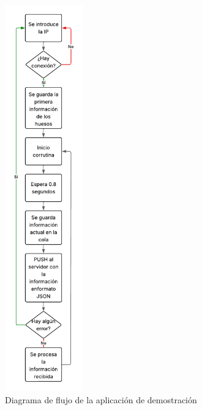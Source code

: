 \begin{figure}[H]
	\centering
	\includegraphics[width=0.3\textwidth]{Imagenes/Vectorial/FlujoAppFinal.pdf}
	\caption{Diagrama de flujo de la aplicación de demostración}
	\label{fig:Demo}
\end{figure}